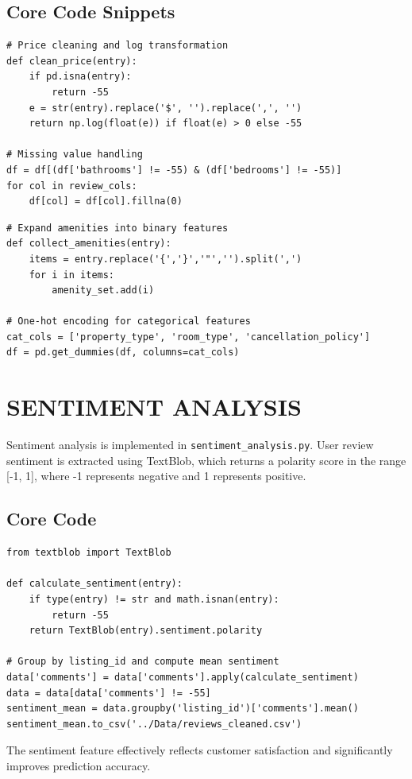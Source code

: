 \documentclass[11pt,a4paper]{article}
\begin{document}
\subsection{Core Code Snippets}
\begin{lstlisting}
# Price cleaning and log transformation
def clean_price(entry):
    if pd.isna(entry):
        return -55
    e = str(entry).replace('$', '').replace(',', '')
    return np.log(float(e)) if float(e) > 0 else -55

# Missing value handling
df = df[(df['bathrooms'] != -55) & (df['bedrooms'] != -55)]
for col in review_cols:
    df[col] = df[col].fillna(0)
\end{lstlisting}

\begin{lstlisting}
# Expand amenities into binary features
def collect_amenities(entry):
    items = entry.replace('{','}','"','').split(',')
    for i in items:
        amenity_set.add(i)

# One-hot encoding for categorical features
cat_cols = ['property_type', 'room_type', 'cancellation_policy']
df = pd.get_dummies(df, columns=cat_cols)
\end{lstlisting}

\section{SENTIMENT ANALYSIS}
Sentiment analysis is implemented in \texttt{sentiment\_analysis.py}. User review sentiment is extracted using TextBlob, which returns a polarity score in the range [-1, 1], where -1 represents negative and 1 represents positive.

\subsection{Core Code}
\begin{lstlisting}
from textblob import TextBlob

def calculate_sentiment(entry):
    if type(entry) != str and math.isnan(entry):
        return -55
    return TextBlob(entry).sentiment.polarity

# Group by listing_id and compute mean sentiment
data['comments'] = data['comments'].apply(calculate_sentiment)
data = data[data['comments'] != -55]
sentiment_mean = data.groupby('listing_id')['comments'].mean()
sentiment_mean.to_csv('../Data/reviews_cleaned.csv')
\end{lstlisting}

The sentiment feature effectively reflects customer satisfaction and significantly improves prediction accuracy.
\end{document}
